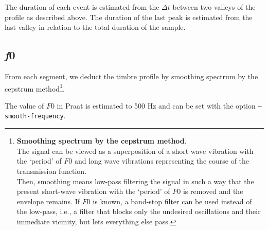 The duration of each event is estimated from the $\Delta t$ between two valleys of the profile as described above. The duration of the last peak is estimated from the last valley in relation to the total duration of the sample.

\subsection{\textit{f}0}

From each segment, we deduct the timbre profile by smoothing spectrum by the cepstrum method\footnote{\textbf{Smoothing spectrum by the cepstrum method}.\\ The signal can be viewed as a superposition of a short wave vibration with the `period' of $F0$ and long wave vibrations representing the course of the transmission function.\\
Then, smoothing means low-pass filtering the signal in such a way that the present short-wave vibration with the `period' of $F0$ is removed and the envelope remains. If $F0$ is known, a band-stop filter can be used instead of the low-pass, i.e., a filter that blocks only the undesired oscillations and their immediate vicinity, but lets everything else pass.}.


\smallskip

The value of $F0$ in Praat is estimated to 500 Hz and can be set with the option \texttt{--smooth-frequency}.

\smallskip

